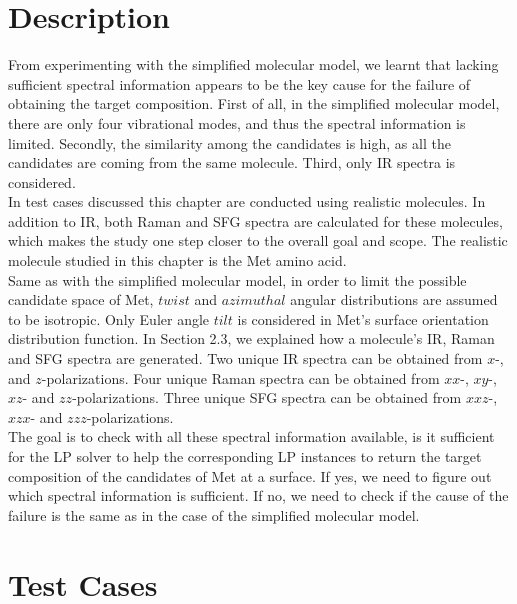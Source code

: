  \label{ch:4}
\section{Description}

From experimenting with the simplified molecular model, we learnt that lacking sufficient spectral information appears to be the key cause for the failure of obtaining the target composition. First of all, in the simplified molecular model, there are only four vibrational modes, and thus the spectral information is limited. Secondly, the similarity among the candidates is high, as all the candidates are coming from the same molecule. Third, only IR spectra is considered. \\

In test cases discussed this chapter are conducted using realistic molecules. In addition to IR, both Raman and SFG spectra are calculated for these molecules, which makes the study one step closer to the overall goal and scope. The realistic molecule studied in this chapter is the Met amino acid. \\

Same as with the simplified molecular model, in order to limit the possible candidate space of Met, $twist$ and $azimuthal$ angular distributions are assumed to be isotropic. Only Euler angle $tilt$ is considered in Met's surface orientation distribution function. In Section 2.3, we explained how a molecule's IR, Raman and SFG spectra are generated. Two unique IR spectra can be obtained from $x$-, and $z$-polarizations. Four unique Raman spectra can be obtained from $xx$-, $xy$-, $xz$- and $zz$-polarizations. Three unique SFG spectra can be obtained from $xxz$-, $xzx$- and $zzz$-polarizations.\\

The goal is to check with all these spectral information available, is it sufficient for the LP solver to help the corresponding LP instances to return the target composition of the candidates of Met at a surface. If yes, we need to figure out which spectral information is sufficient. If no, we need to check if the cause of the failure is the same as in the case of the simplified molecular model. \\

\section{Test Cases}

